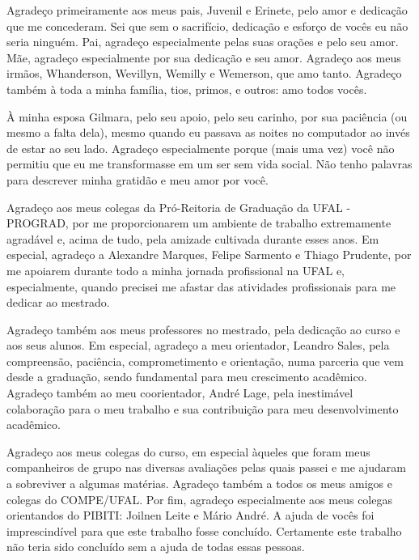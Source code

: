 
\begin{agradecimentos}
Agradeço primeiramente aos meus pais, Juvenil e Erinete, pelo amor e dedicação que me concederam. Sei que sem o sacrifício, dedicação e esforço de vocês eu não seria ninguém. Pai, agradeço especialmente pelas suas orações e pelo seu amor. Mãe, agradeço especialmente por sua dedicação e seu amor. Agradeço aos meus irmãos, Whanderson, Wevillyn, Wemilly e Wemerson, que amo tanto. Agradeço também à toda a minha família, tios, primos, e outros: amo todos vocês. 

À minha esposa Gilmara, pelo seu apoio, pelo seu carinho, por sua paciência (ou mesmo a falta dela), mesmo quando eu passava as noites no computador ao invés de estar ao seu lado. Agradeço especialmente porque (mais uma vez) você não permitiu que eu me transformasse em um ser sem vida social. Não tenho palavras para descrever minha gratidão e meu amor por você.

Agradeço aos meus colegas da Pró-Reitoria de Graduação da UFAL - PROGRAD, por me proporcionarem um ambiente de trabalho extremamente agradável e, acima de tudo, pela amizade cultivada durante esses anos.
Em especial, agradeço a Alexandre Marques, Felipe Sarmento e Thiago Prudente, por me apoiarem durante todo a minha jornada profissional na UFAL e, especialmente, quando precisei me afastar das atividades profissionais para me dedicar ao mestrado.

Agradeço também aos meus professores no mestrado, pela dedicação ao curso e aos seus alunos.
Em especial, agradeço a meu orientador, Leandro Sales, pela compreensão, paciência, comprometimento e orientação, numa parceria que vem desde a graduação, sendo fundamental para meu crescimento acadêmico. Agradeço também ao meu coorientador, André Lage, pela inestimável colaboração para o meu trabalho e sua contribuição para meu desenvolvimento acadêmico.

Agradeço aos meus colegas do curso, em especial àqueles que foram meus companheiros de grupo nas diversas avaliações pelas quais passei e me ajudaram a sobreviver a algumas matérias. 
Agradeço também a todos os meus amigos e colegas do COMPE/UFAL.
Por fim, agradeço especialmente aos meus colegas orientandos do PIBITI: Joilnen Leite e Mário André. A ajuda de vocês foi imprescindível para que este trabalho fosse concluído.
Certamente este trabalho não teria sido concluído sem a ajuda de todas essas pessoas. 
\end{agradecimentos}

